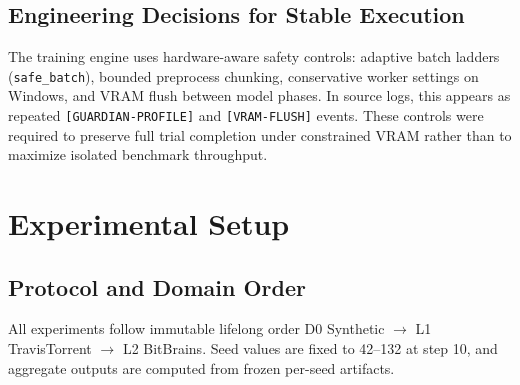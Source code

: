 \documentclass[10pt,twocolumn]{article}
\begin{document}
\subsection{Engineering Decisions for Stable Execution}
The training engine uses hardware-aware safety controls: adaptive batch ladders (\texttt{safe\_batch}), bounded preprocess chunking, conservative worker settings on Windows, and VRAM flush between model phases. In source logs, this appears as repeated \texttt{[GUARDIAN-PROFILE]} and \texttt{[VRAM-FLUSH]} events. These controls were required to preserve full trial completion under constrained VRAM rather than to maximize isolated benchmark throughput.

\FloatBarrier
\section{Experimental Setup}
\subsection{Protocol and Domain Order}
All experiments follow immutable lifelong order D0 Synthetic \(\rightarrow\) L1 TravisTorrent \(\rightarrow\) L2 BitBrains. Seed values are fixed to 42--132 at step 10, and aggregate outputs are computed from frozen per-seed artifacts.

\begin{table}[H]
\centering
\caption{Dataset partitions used by sequence (Task-B) and graph (Task-C) training paths.}
\label{tab:data_setup}
\end{table}
\end{document}
